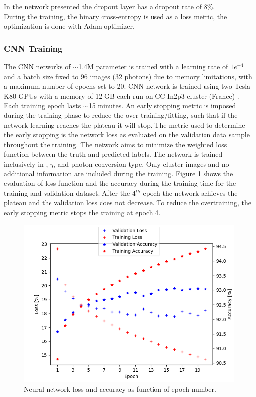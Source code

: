 In the network presented the dropout layer has a dropout rate of 8\%.\\
During the training, the binary cross-entropy is used as a loss metric, the optimization is done with Adam optimizer.

\subsubsection{CNN Training}
\label{gamma:CNN:Training}
The CNN networks of $\sim$1.4M parameter is trained with a learning rate of $1e^{-4}$ and a batch size fixed to 96 images (32 photons) due to memory limitations, with a maximum number of epochs set to 20. CNN network is trained using two Tesla K80 GPUs with a memory of 12 GB each run on CC-In2p3 cluster (France) \cite{cca}. Each training epoch lasts $\sim$15 minutes. An early stopping metric \cite{early} is imposed during the training phase to reduce the over-training/fitting, such that if the network learning reaches the plateau it will stop. The metric used to determine the early stopping is the network loss as evaluated on the validation data sample throughout the training. The network aims to minimize the weighted loss function between the truth and predicted labels.
The network is trained inclusively in \eT, $\eta$, and photon conversion type. Only cluster images and no additional information are included during the training.
Figure \ref{fig:gamma:CNN:Training:loss} shows the evaluation of loss function and the accuracy during the training time for the training and validation dataset. After the 4$^{th}$ epoch the network achieves the plateau and the validation loss does not decrease. To reduce the overtraining, the early stopping metric stops the training at epoch 4.
\begin{figure}[htbp]
    \centering
    \includegraphics[width=.7\textwidth]{Ch3/Img/CNN_Loss_Accuracy.png}
    \begin{tcolorbox}[colback=black!5!white,colframe=white!75!black]
    \caption{Neural network loss and accuracy as function of epoch number.}
    \label{fig:gamma:CNN:Training:loss}
    \end{tcolorbox}
    
\end{figure}

